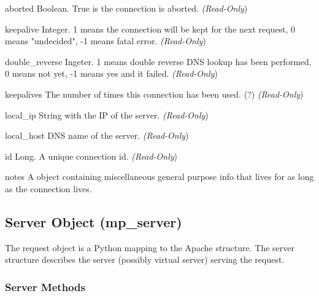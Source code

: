 \begin{memberdesc}[connection]{aborted}
Boolean. True is the connection is aborted.
\emph{(Read-Only})
\end{memberdesc}

\begin{memberdesc}[connection]{keepalive}
Integer. 1 means the connection will be kept for the next request, 0 means
"undecided", -1 means fatal error.
\emph{(Read-Only})
\end{memberdesc}

\begin{memberdesc}[connection]{double_reverse}
Ingeter. 1 means double reverse DNS lookup has been performed, 0 means
not yet, -1 means yes and it failed.
\emph{(Read-Only})
\end{memberdesc}

\begin{memberdesc}[connection]{keepalives}
The number of times this connection has been used. (?)
\emph{(Read-Only})
\end{memberdesc}

\begin{memberdesc}[connection]{local_ip}
String with the IP of the server.
\emph{(Read-Only})
\end{memberdesc}

\begin{memberdesc}[connection]{local_host}
DNS name of the server.
\emph{(Read-Only})
\end{memberdesc}

\begin{memberdesc}[connection]{id}
Long. A unique connection id.
\emph{(Read-Only})
\end{memberdesc}

\begin{memberdesc}[connection]{notes}
A  object containing miscellaneous general purpose info that lives for
as long as the connection lives. 
\end{memberdesc}


\subsection{Server Object (mp_server)\label{pyapi-mpserver}}

The request object is a Python mapping to the Apache 
structure. The server structure describes the server (possibly virtual
server) serving the request.

\subsubsection{Server Methods\label{pyapi-mpsrv-meth}}

